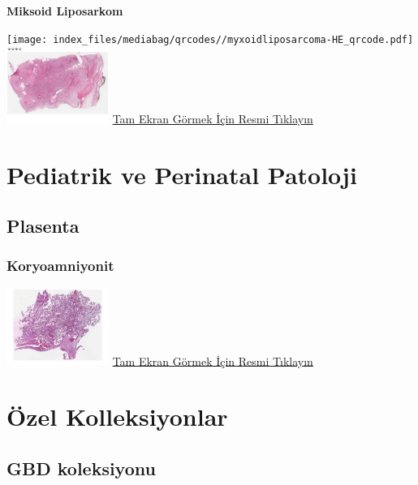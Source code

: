 \documentclass[
  letterpaper,
  DIV=11,
  numbers=noendperiod]{scrreprt}
\begin{document}
\textbf{Miksoid Liposarkom}

\texttt{[image: index\_files/mediabag/qrcodes//myxoidliposarcoma-HE\_qrcode.pdf]}
\href{https://images.patolojiatlasi.com/myxoidliposarcoma/HE.html}{\includegraphics[width=0.25\textwidth,height=\textheight]{./screenshots/thumbnail_myxoidliposarcoma.png}}
\href{https://images.patolojiatlasi.com/myxoidliposarcoma/HE.html}{Tam
Ekran Görmek İçin Resmi Tıklayın}

\part{Pediatrik ve Perinatal Patoloji}

\hypertarget{sec-plasenta}{%
\chapter{Plasenta}\label{sec-plasenta}}

\hypertarget{sec-koryoamniyonit}{%
\section{Koryoamniyonit}\label{sec-koryoamniyonit}}

\href{https://images.patolojiatlasi.com/chorioamnionitis/HE.html}{\includegraphics[width=0.25\textwidth,height=\textheight]{./screenshots/thumbnail_chorioamnionitis.png}}
\href{https://images.patolojiatlasi.com/chorioamnionitis/HE.html}{Tam
Ekran Görmek İçin Resmi Tıklayın}

\part{Özel Kolleksiyonlar}

\hypertarget{gbd-koleksiyonu}{%
\chapter{GBD koleksiyonu}\label{gbd-koleksiyonu}}
\end{document}
